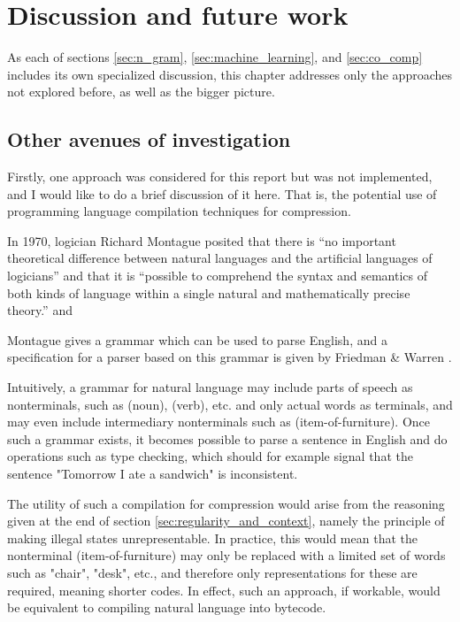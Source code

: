 \chapter{Discussion and future work}
\label{chap:discussion}

As each of sections \ref{sec:n_gram}, \ref{sec:machine_learning}, and \ref{sec:co_comp} includes its own specialized discussion, this chapter addresses only the approaches not explored before, as well as the bigger picture.

\section{Other avenues of investigation}

Firstly, one approach was considered for this report but was not implemented, and I would like to do a brief discussion of it here. That is, the potential use of programming language compilation techniques for compression.

In 1970, logician Richard Montague posited that there is “no important theoretical difference between natural languages and the artificial languages of logicians” and that it is “possible to comprehend the syntax and semantics of both kinds of language within a single natural and mathematically precise theory.” \autocite{Montague1970_universal_grammar} and \autocite{Montague1970_english_formal}

Montague gives a grammar which can be used to parse English, and a specification for a parser based on this grammar is given by Friedman \& Warren \autocite{Friedman1978}.

Intuitively, a grammar for natural language may include parts of speech as nonterminals, such as (noun), (verb), etc. and only actual words as terminals, and may even include intermediary nonterminals such as (item-of-furniture). Once such a grammar exists, it becomes possible to parse a sentence in English and do operations such as type checking, which should for example signal that the sentence "Tomorrow I ate a sandwich" is inconsistent.

The utility of such a compilation for compression would arise from the reasoning given at the end of section \ref{sec:regularity_and_context}, namely the principle of making illegal states unrepresentable. In practice, this would mean that the nonterminal (item-of-furniture) may only be replaced with a limited set of words such as "chair", "desk", etc., and therefore only representations for these are required, meaning shorter codes. In effect, such an approach, if workable, would be equivalent to compiling natural language into bytecode.

